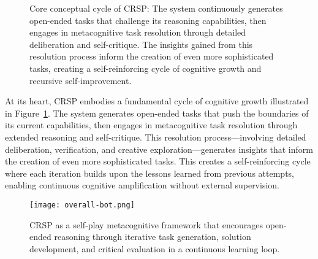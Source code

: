 \documentclass[10pt,a4paper]{article}
\begin{document}
\begin{figure}[htbp]
\centering
{}
\caption{Core conceptual cycle of CRSP: The system continuously generates open-ended tasks that challenge its reasoning capabilities, then engages in metacognitive task resolution through detailed deliberation and self-critique. The insights gained from this resolution process inform the creation of even more sophisticated tasks, creating a self-reinforcing cycle of cognitive growth and recursive self-improvement.}
\label{fig:crsp_cycle}
\end{figure}

At its heart, CRSP embodies a fundamental cycle of cognitive growth illustrated in Figure~\ref{fig:crsp_cycle}. The system generates open-ended tasks that push the boundaries of its current capabilities, then engages in metacognitive task resolution through extended reasoning and self-critique. This resolution process—involving detailed deliberation, verification, and creative exploration—generates insights that inform the creation of even more sophisticated tasks. This creates a self-reinforcing cycle where each iteration builds upon the lessons learned from previous attempts, enabling continuous cognitive amplification without external supervision.

\begin{figure}[htbp]
\centering
\texttt{[image: overall-bot.png]}
\caption{CRSP as a self-play metacognitive framework that encourages open-ended reasoning through iterative task generation, solution development, and critical evaluation in a continuous learning loop.}
\label{fig:overall_crsp}
\end{figure}
\end{document}
